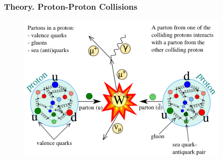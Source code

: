\begin{frame}\frametitle{Theory. Proton-Proton Collisions}
\begin{figure}[htb]
  \begin{center}
    \includegraphics[width=0.95\textwidth]{../figs/ForPresentation/Theory_ppCollision.png}
  \end{center}
\end{figure}
\end{frame}%

